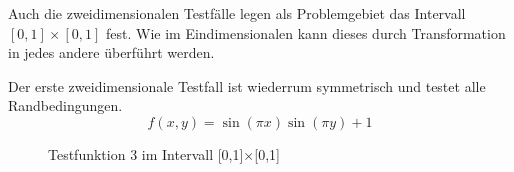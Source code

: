 Auch die zweidimensionalen Testfälle legen als Problemgebiet das Intervall
$[0,1]\times[0,1]$ fest. Wie im Eindimensionalen kann dieses durch Transformation
in jedes andere überführt werden.

Der erste zweidimensionale Testfall ist wiederrum symmetrisch und testet alle
Randbedingungen.
\begin{equation}
f(x,y) = \sin(\pi x) \sin(\pi y) + 1
\end{equation}

\begin{figure}[h]
\centering
\begin{subfigure}[b]{.5\linewidth}
\centering
{}
\end{subfigure}%
\begin{subfigure}[b]{.5\linewidth}
\centering
{}
\end{subfigure}
\caption{Testfunktion 3 im Intervall [0,1]$\times$[0,1]}\label{fig:tf3}
\end{figure}

